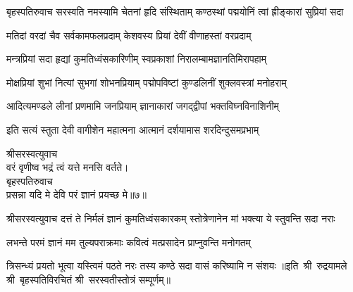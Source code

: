 
बृहस्पतिरुवाच\nopagebreak[4]
\twolineshloka
{सरस्वति नमस्यामि चेतनां हृदि संस्थिताम्}
{कण्ठस्थां पद्मयोनिं त्वां ह्रीङ्कारां सुप्रियां सदा}

\twolineshloka
{मतिदां वरदां चैव सर्वकामफलप्रदाम्}
{केशवस्य प्रियां देवीं वीणाहस्तां वरप्रदाम्}

\twolineshloka
{मन्त्रप्रियां सदा हृद्यां कुमतिध्वंसकारिणीम्}
{स्वप्रकाशां निरालम्बामज्ञानतिमिरापहाम्}

\twolineshloka
{मोक्षप्रियां शुभां नित्यां सुभगां शोभनप्रियाम्}
{पद्मोपविष्टां कुण्डलिनीं शुक्लवस्त्रां मनोहराम्}

\twolineshloka
{आदित्यमण्डले लीनां प्रणमामि जनप्रियाम्}
{ज्ञानाकारां जगद्द्वीपां भक्तविघ्नविनाशिनीम्}

\twolineshloka
{इति सत्यं स्तुता देवी वागीशेन महात्मना}
{आत्मानं दर्शयामास शरदिन्दुसमप्रभाम्}

श्रीसरस्वत्युवाच\\
वरं वृणीष्व भद्रं त्वं यत्ते मनसि वर्तते।\\
बृहस्पतिरुवाच\\
प्रसन्ना यदि मे देवि परं ज्ञानं प्रयच्छ मे॥७॥\\

श्रीसरस्वत्युवाच
\twolineshloka
{दत्तं ते निर्मलं ज्ञानं कुमतिध्वंसकारकम्}
{स्तोत्रेणानेन मां भक्त्या ये स्तुवन्ति सदा नराः}

\twolineshloka
{लभन्ते परमं ज्ञानं मम तुल्यपराक्रमाः}
{कवित्वं मत्प्रसादेन प्राप्नुवन्ति मनोगतम्}

\twolineshloka
{त्रिसन्ध्यं प्रयतो भूत्वा यस्त्विमं पठते नरः}
{तस्य कण्ठे सदा वासं करिष्यामि न संशयः}
॥इति~श्री~रुद्रयामले श्री~बृहस्पतिविरचितं श्री~सरस्वतीस्तोत्रं सम्पूर्णम्॥